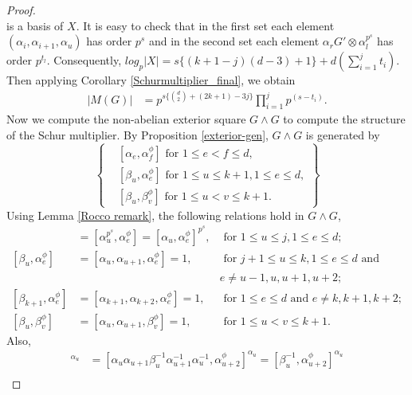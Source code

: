 \documentclass[preprint,sort&compress,12pt]{elsarticle}
\numberwithin{equation}{section}
\theoremstyle{definition}
\begin{document}
\begin{proof}
\begin{equation*}
\end{equation*}
   is a basis of $X$. It is easy to check that in the first set each element $(\alpha_i,\alpha_{i+1},\alpha_u)$ has order $p^s$ and in the second set each element  $\alpha_ r G' \otimes \alpha_l^{p^s}$ has order $p^{t_l}$. Consequently, $log_p|X|=s\{(k+1-j)(d-3)+1\}+ d(\sum \limits_{i=1}^{j}t_i) $. Then applying Corollary \ref{Schurmultiplier_final}, we obtain
\begin{align*}
    |M(G)|%
          & = p^{s\{\binom{d}{2}+(2k+1)-3j\}}\prod_{i=1}^{j}p^{(s-t_i)}.
\end{align*}
Now we compute the non-abelian exterior square $G \wedge G$ to compute the structure of the Schur multiplier. 
By Proposition \ref{exterior-gen}, $G \wedge G$ is generated by
\[\left\{
\begin{array}{cl}
    &[\alpha_e,\alpha_f^{\phi}] \text{ for } 1\le e <f \le d,\\
    &[\beta_u,\alpha_e^{\phi}]\text{ for } 1\le u\le k+1, 1\le e \le d, \\
    &[\beta_u,\beta_v^{\phi}]\text{ for }  1\le u<v\le k+1.
\end{array}
\right\}\]
Using Lemma \ref{Rocco remark},  the following relations hold in $G \wedge G$, 
\begin{align*}
   [\beta_u,\alpha_e^{\phi}]&=[\alpha_u^{p^s},\alpha_e^{\phi}]=[\alpha_u,\alpha_e^{\phi}]^{p^s}, &\text{ for } 1 \le u \le j, 1 \le e \le d;\\
  [\beta_u,\alpha_e^{\phi}]&=[\alpha_u,\alpha_{u+1},\alpha_e^{\phi}]=1, &\text{ for }  j+1 \le u \le k, 1 \le e \le d \text{ and } \\
  & &e \neq u-1,u,u+1,u+2;\\
   [\beta_{k+1},\alpha_e^{\phi}]&=[\alpha_{k+1},\alpha_{k+2},\alpha_e^{\phi}]=1, &\text{ for } 1 \le e \le d \text{ and } e \neq k,k+1,k+2;\\
   [\beta_u,\beta_v^{\phi}]&=[\alpha_u,\alpha_{u+1},\beta_v^{\phi}]=1, & \text{ for }  1\le u<v\le k+1.
\end{align*}
Also,
\begin{align*}
    [\alpha_{u+1}^{-1},\alpha_u^{-1},\alpha_{u+2}^\phi]^{\alpha_u}
    & = [\alpha_u\alpha_{u+1}\beta_u^{-1}\alpha_{u+1}^{-1}\alpha_u^{-1},\alpha_{u+2}^\phi]^{\alpha_u}= [\beta_u^{-1},\alpha_{u+2}^\phi]^{\alpha_u}\\

\end{align*}
\end{proof}
\end{document}
